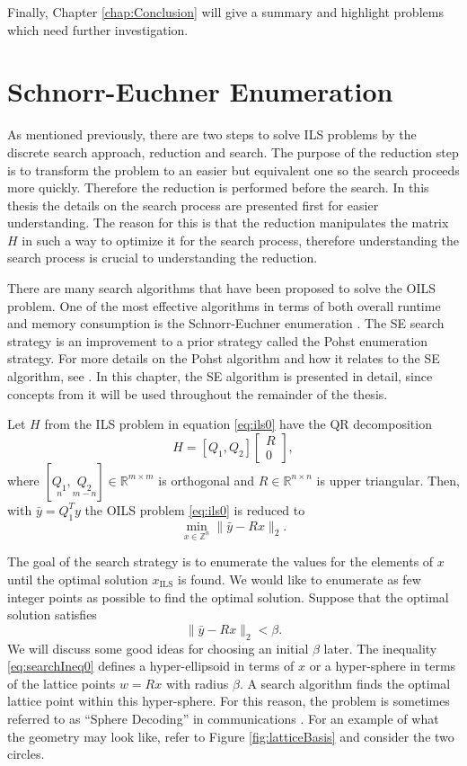\documentclass[12pt,Bold,letterpaper]{mcgilletdclass}
\newcommand{\bmx}{\begin{bmatrix}}
\newcommand{\emx}{\end{bmatrix}}
\newcommand{\be}{\begin{equation}}
\newcommand{\ee}{\end{equation}}
\newcommand{\by}{{\bar{y}}}
\begin{document}
Finally, Chapter \ref{chap:Conclusion} will give a summary and highlight problems which need further investigation.

\chapter{Schnorr-Euchner Enumeration} \label{chap:SESearch}

As mentioned previously, there are two steps to solve ILS problems by the discrete search approach, reduction and search. The purpose of the reduction step is to transform the problem to an easier but equivalent one so the search proceeds more quickly. Therefore the reduction is performed before the search. In this thesis the details on the search process are presented first for easier understanding. The reason for this is that the reduction manipulates the matrix $H$ in such a way to optimize it for the search process, therefore understanding the search process is crucial to understanding the reduction.

There are many search algorithms that have been proposed to solve the OILS problem. One of the most effective algorithms in terms of both overall runtime and memory consumption is the Schnorr-Euchner enumeration \cite{SchE94}. The SE search strategy is an improvement to a prior strategy called the Pohst enumeration strategy. For more details on the Pohst algorithm and how it relates to the SE algorithm, see \cite{AgrEVZ02}. In this chapter, the SE algorithm is presented in detail, since concepts from it will be used throughout the remainder of the thesis.

Let $H$ from the ILS problem in equation \eqref{eq:ils0} have the QR decomposition
$$
H=[Q_1, Q_2] \bmx R \\ 0 \emx,
$$
where $[\underset{n}{Q_1}, \underset{m-n}{Q_2}]  \in \mathbb{R}^{m\times m}$ is orthogonal
and $R\in \mathbb{R}^{n\times n}$ is upper triangular. 
Then, with $\bar{y}=Q_1^Ty$ the OILS problem \eqref{eq:ils0} is reduced to 
\be 
\label{eq:ils}
\min_{x \in  {\mathbb{Z}^n}}  \| \by- Rx \|_2.
\ee

The goal of the search strategy is to enumerate the values for the elements of $x$ until the optimal solution $x_{\scriptscriptstyle{\mathrm{ILS}}}$ is found. We would like to enumerate as few integer points as possible to find the optimal solution. Suppose that the optimal solution satisfies
\be 
\label{eq:searchIneq0}
 \| \by- Rx \|_2 < \beta. 
\ee
We will discuss some good ideas for choosing an initial $\beta$ later. The inequality \eqref{eq:searchIneq0} defines a hyper-ellipsoid in terms of $x$ or a hyper-sphere in terms of the lattice points $w=Rx$ with radius $\beta$. A search algorithm finds the optimal lattice point within this hyper-sphere. For this reason, the problem is sometimes referred to as ``Sphere Decoding'' in communications \cite{HasV05}. For an example of what the geometry may look like, refer to Figure \ref{fig:latticeBasis} and consider the two circles.
\end{document}

